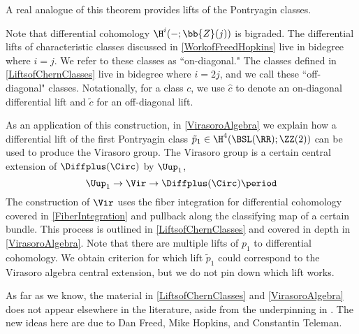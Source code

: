 \noindent A real analogue of this theorem provides lifts of the Pontryagin classes.

\begin{rmk}\label{rmk-OnOffDiagonal}
Note that differential cohomology $\H^i(-;\bb{Z}(j))$ is bigraded. 
The differential lifts of characteristic classes discussed in \cref{WorkofFreedHopkins} live in bidegree where $i=j$. 
We refer to these classes as ``on-diagonal." 
The classes defined in \cref{LiftsofChernClasses} live in bidegree where $i=2j$, 
and we call these ``off-diagonal" classes. 
Notationally, for a class $c$, we use $\hat{c}$ to denote an on-diagonal differential lift 
and $\tilde{c}$ for an off-diagonal lift.
\end{rmk}

As an application of this construction, in \cref{VirasoroAlgebra} we explain how a differential lift of the first Pontryagin class $\tilde{p}_1\in\H^4(\BSL(\RR);\ZZ(2))$ can be used to produce the Virasoro group. The Virasoro group is a certain central extension of $\Diffplus(\Circ)$ by $\Uup_1$,
\[
	\Uup_1\to\Vir\to\Diffplus(\Circ) \period
\]
The construction of $\Vir$ uses the fiber integration for differential cohomology covered in \cref{FiberIntegration} and pullback along the classifying map of a certain bundle. 
This process is outlined in \cref{LiftsofChernClasses} and covered in depth in \cref{VirasoroAlgebra}. 
Note that there are multiple lifts of $p_1$ to differential cohomology. 
We obtain criterion for which lift $\tilde{p}_1$ could correspond to the Virasoro algebra central extension, but we do not pin down which lift works.

As far as we know, the material in \cref{LiftsofChernClasses} and \cref{VirasoroAlgebra} does not appear elsewhere in the literature, aside from the underpinning in \cite{BottsPaper}. 
The new ideas here are due to Dan Freed, Mike Hopkins, and Constantin Teleman.





